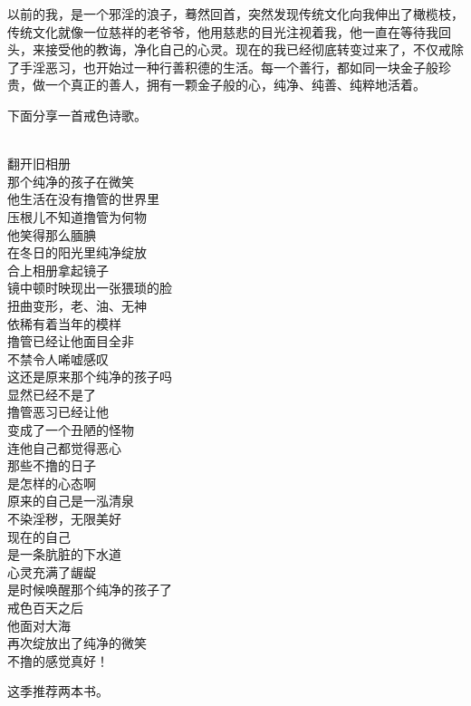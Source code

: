以前的我，是一个邪淫的浪子，蓦然回首，突然发现传统文化向我伸出了橄榄枝，传统文化就像一位慈祥的老爷爷，他用慈悲的目光注视着我，他一直在等待我回头，来接受他的教诲，净化自己的心灵。现在的我已经彻底转变过来了，不仅戒除了手淫恶习，也开始过一种行善积德的生活。每一个善行，都如同一块金子般珍贵，做一个真正的善人，拥有一颗金子般的心，纯净、纯善、纯粹地活着。

下面分享一首戒色诗歌。

\begin{poem}[唤醒内心的孩子]
    \begin{multicols}{3}
        \centering~\\
        翻开旧相册 \\ 那个纯净的孩子在微笑 \\ 他生活在没有撸管的世界里 \\ 压根儿不知道撸管为何物 \\ 他笑得那么腼腆 \\ 在冬日的阳光里纯净绽放 \\ 合上相册拿起镜子 \\ 镜中顿时映现出一张猥琐的脸 \\ 扭曲变形，老、油、无神 \\ 依稀有着当年的模样 \\ 撸管已经让他面目全非 \\ 不禁令人唏嘘感叹 \\ 这还是原来那个纯净的孩子吗 \\ 显然已经不是了 \\ 撸管恶习已经让他 \\ 变成了一个丑陋的怪物 \\ 连他自己都觉得恶心 \\ 那些不撸的日子 \\ 是怎样的心态啊 \\ 原来的自己是一泓清泉 \\ 不染淫秽，无限美好 \\ 现在的自己 \\ 是一条肮脏的下水道 \\ 心灵充满了龌龊 \\ 是时候唤醒那个纯净的孩子了 \\ 戒色百天之后 \\ 他面对大海 \\ 再次绽放出了纯净的微笑 \\ 不撸的感觉真好！
    \end{multicols}
\end{poem}

这季推荐两本书。

